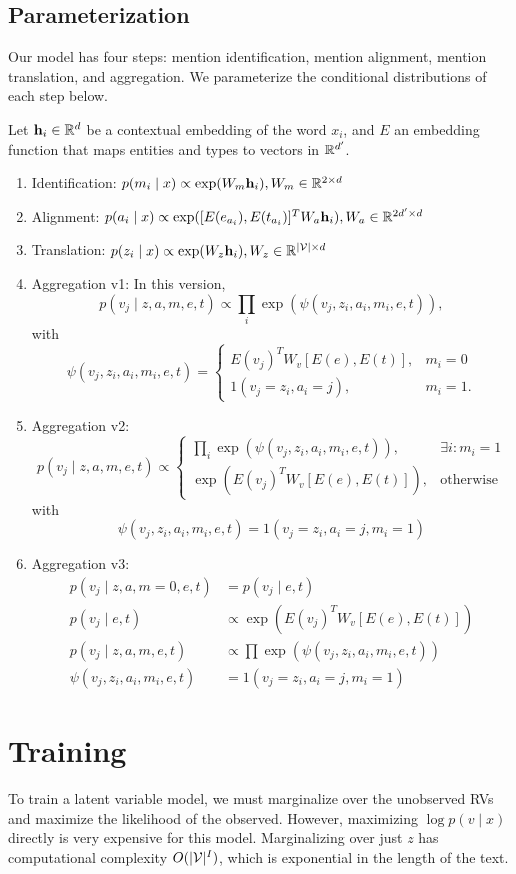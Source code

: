 \documentclass[12pt]{article}
\begin{document}
\subsection{Parameterization}
Our model has four steps: mention identification, mention alignment, 
mention translation, and aggregation.
We parameterize the conditional distributions of each step below.

Let $\mathbf{h}_i \in \mathbb{R}^d$ be a contextual embedding of the word $x_i$,
and $E$ an embedding function that maps entities and types
to vectors in $\mathbb{R}^{d'}$.
\begin{enumerate}
\item Identification: $p(m_i \mid x) \propto \exp(W_m\mathbf{h}_i), W_m \in \mathbb{R}^{2 \times d}$
\item Alignment: $p(a_i \mid x) \propto \exp([E(e_{a_i}), E(t_{a_i})]^TW_a \mathbf{h}_i),
W_a \in \mathbb{R}^{2d' \times d}$ 
\item Translation: $p(z_i \mid x) \propto \exp(W_z \mathbf{h}_i), W_z \in \mathbb{R}^{|\mathcal{V}| \times d}$
\item Aggregation v1: In this version, 
$$p(v_j \mid z,a,m,e,t) \propto \prod_i \exp(\psi(v_j, z_i, a_i, m_i,e,t)),$$
with
$$
\psi(v_j, z_i, a_i, m_i,e,t) = \begin{cases}
E(v_j)^TW_v [E(e),E(t)], & m_i = 0 \\
1(v_j = z_i, a_i = j), & m_i = 1.
\end{cases}
$$
\item Aggregation v2: 
$$p(v_j \mid z,a,m,e,t) \propto \begin{cases}
\prod_i \exp(\psi(v_j, z_i, a_i, m_i,e,t)), & \exists i: m_i = 1\\
\exp(E(v_j)^TW_v [E(e),E(t)]), & \mathrm{otherwise}
\end{cases}
$$
with
$$
\psi(v_j, z_i, a_i, m_i,e,t) = 1(v_j = z_i, a_i = j, m_i=1)
$$
\item Aggregation v3:
\begin{align*}
p(v_j \mid z,a,m=0,e,t) &= p(v_j \mid e,t)\\
p(v_j \mid e,t) & \propto \exp(E(v_j)^TW_v [E(e),E(t)])\\
p(v_j \mid z,a,m,e,t) &\propto \prod \exp(\psi(v_j, z_i,a_i,m_i,e,t))\\
\psi(v_j, z_i, a_i, m_i,e,t) &= 1(v_j = z_i, a_i = j, m_i=1)
\end{align*}
\end{enumerate}

\section{Training}
To train a latent variable model, we must marginalize over the unobserved RVs
and maximize the likelihood of the observed.
However, maximizing $\log p(v \mid x)$ directly is very expensive for this model.
Marginalizing over just $z$ has computational complexity $O(|\mathcal{V}|^{I})$, which is exponential in
the length of the text.
\end{document}
